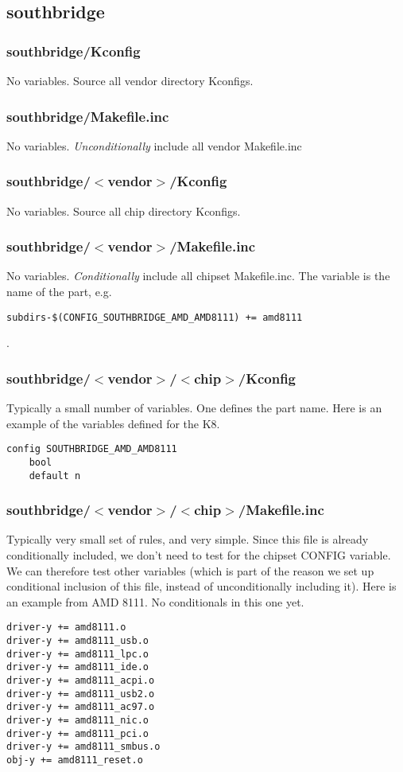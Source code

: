 \documentclass[10pt,letterpaper]{article}
\begin{document}
\subsection{southbridge}
\subsubsection{southbridge/Kconfig}
No variables. Source all vendor directory Kconfigs.
\subsubsection{southbridge/Makefile.inc}
No variables. {\em Unconditionally} include all vendor Makefile.inc
\subsubsection{southbridge/$<$vendor$>$/Kconfig}
No variables. Source all chip directory Kconfigs.
\subsubsection{southbridge/$<$vendor$>$/Makefile.inc}
No variables. {\em Conditionally} include all chipset Makefile.inc. The variable
is the name of the part, e.g.
\begin{verbatim}
subdirs-$(CONFIG_SOUTHBRIDGE_AMD_AMD8111) += amd8111
\end{verbatim}
.
\subsubsection{southbridge/$<$vendor$>$/$<$chip$>$/Kconfig}
Typically a small number of variables. One defines the part name. Here is an example
of the variables defined for the K8.
\begin{verbatim}
config SOUTHBRIDGE_AMD_AMD8111
	bool
	default n

\end{verbatim}
\subsubsection{southbridge/$<$vendor$>$/$<$chip$>$/Makefile.inc}
Typically very small set of rules, and very simple.
Since this file is already conditionally included,
we don't need to test for the chipset CONFIG variable. We
can therefore test other variables (which is part of the reason
we set up conditional inclusion of this file, instead
of unconditionally including it). Here is an example from AMD 8111.
No conditionals in this one yet. 
\begin{verbatim}
driver-y += amd8111.o
driver-y += amd8111_usb.o
driver-y += amd8111_lpc.o
driver-y += amd8111_ide.o
driver-y += amd8111_acpi.o
driver-y += amd8111_usb2.o
driver-y += amd8111_ac97.o
driver-y += amd8111_nic.o
driver-y += amd8111_pci.o
driver-y += amd8111_smbus.o
obj-y += amd8111_reset.o
\end{verbatim}
\end{document}
